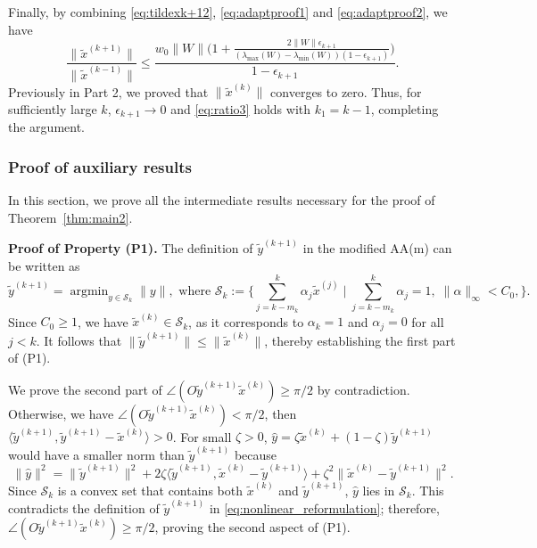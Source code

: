 \documentclass[11pt]{article}
\newcommand{\bx}{\bm{x}}
\newcommand{\bW}{\bm{W}}
\newcommand{\by}{\bm{y}}
\DeclareMathOperator*{\argmin}{argmin}
\begin{document}
{{Finally, by combining \eqref{eq:tildexk+12}, \eqref{eq:adaptproof1} and  \eqref{eq:adaptproof2},
we have
\begin{equation}\label{eq:ratio2}
\frac{\|\widetilde{x}^{(k+1)}\|}{\|\widetilde{x}^{(k-1)}\|}\leq \frac{w_0\|W\|\Big(1+\frac{2{\|W\|\epsilon_{k+1}}}{(\lambda_{\max}(W)-\lambda_{\min}(W))({1-\epsilon_{k+1}})}\Big)}{1-\epsilon_{k+1}}.
\end{equation}
Previously in Part 2, we proved that  $\|\widetilde{x}^{(k)}\|$ converges to zero. Thus, for sufficiently large $k$, $\epsilon_{k+1}\rightarrow 0$ and \eqref{eq:ratio3} holds with $k_1=k-1$, completing the argument. 

\subsubsection{Proof of auxiliary  results}\label{sec:intermediate} 
In this section, we prove all the intermediate results necessary for the proof of Theorem~\ref{thm:main2}.

\vspace{0.1in}
{\bf Proof of Property (P1).} The definition of $\widetilde{y}^{(k+1)}$ in the modified AA(m) can be written as %
\begin{equation}\label{eq:nonlinear_reformulation}
\widetilde{y}^{(k+1)}=\argmin_{ y\in\mathcal{S}_k}\|y\|,\,\,\text{where}\,\,\mathcal{S}_k:=\Big\{\sum_{j=k-m_k}^{k}\alpha_j\widetilde{x}^{(j)} \;\bigg|\; \sum_{j=k-m_k}^{k} \alpha_j=1,\; \|\alpha\|_{\infty}<C_0, \Big\}.%
\end{equation}
Since $C_0\geq 1$, we have $\widetilde{x}^{(k)}\in \mathcal{S}_k$, as it corresponds to $\alpha_k=1$ and $\alpha_j=0$ for all $j<k$. It follows that $\|\widetilde{y}^{(k+1)}\|\leq \|\widetilde{x}^{(k)}\|$, thereby establishing the first part of (P1). 

We prove the second part of $\angle(O \widetilde{y}^{(k+1)} \widetilde{x}^{(k)} )\geq \pi/2$ by contradiction. Otherwise, we have 
 $\angle(O \widetilde{y}^{(k+1)} \widetilde{x}^{(k)} )<\pi/2$, then $\langle\widetilde{y}^{(k+1)},\widetilde{y}^{(k+1)}-\widetilde{x}^{(k)}\rangle>0$. 
For small $\zeta>0$, $\widehat{y}=\zeta\widetilde{x}^{(k)}+(1-\zeta)\widetilde{y}^{(k+1)}$ would have a smaller norm than $\widetilde{y}^{(k+1)}$ because
\[
\|\widehat{y}\|^2=\|\widetilde{y}^{(k+1)}\|^2+2\zeta\langle\widetilde{y}^{(k+1)},\widetilde{x}^{(k)}-\widetilde{y}^{(k+1)}\rangle + \zeta^2\|\widetilde{x}^{(k)}-\widetilde{y}^{(k+1)}\|^2.%
\]
Since $\mathcal{S}_k$ is a convex set that contains both $\widetilde{x}^{(k)}$ and $\widetilde{y}^{(k+1)}$, $\widehat{y}$ lies in $\mathcal{S}_k$. This contradicts the definition of $\widetilde{y}^{(k+1)}$ in  \eqref{eq:nonlinear_reformulation}; therefore, $\angle(O \widetilde{y}^{(k+1)} \widetilde{x}^{(k)} )\geq \pi/2$, proving the second aspect of (P1).

}}
\end{document}
